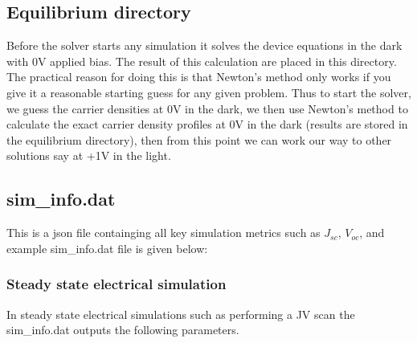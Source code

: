 \subsection{Equilibrium directory}
Before the solver starts any simulation it solves the device equations in the dark with 0V applied bias.  The result of this calculation are placed in this directory.  The practical reason for doing this is that Newton's method only works if you give it a reasonable starting guess for any given problem.  Thus to start the solver, we guess the carrier densities at 0V in the dark, we then use Newton's method to calculate the exact carrier density profiles at 0V in the dark (results are stored in the equilibrium directory), then from this point we can work our way to other solutions say at +1V in the light.\cite{0953-8984-25-21-215301}

\subsection{sim\_info.dat}
\label{sec:siminfo}
This is a json file containging all key simulation metrics such as $J_{sc}$, $V_{oc}$, and example sim\_info.dat file is given below:


\subsubsection{Steady state electrical simulation}
In steady state electrical simulations such as performing a JV scan the sim\_info.dat outputs the following parameters.

